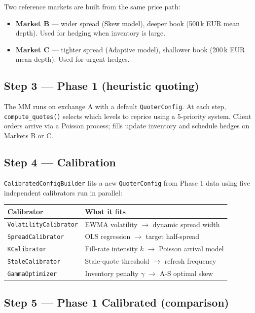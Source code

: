\documentclass[12pt,a4paper]{article}
\begin{document}
Two reference markets are built from the same price path:
\begin{itemize}
  \item \textbf{Market B} --- wider spread (Skew model), deeper book
        (500\,k EUR mean depth). Used for hedging when inventory is large.
  \item \textbf{Market C} --- tighter spread (Adaptive model), shallower book
        (200\,k EUR mean depth). Used for urgent hedges.
\end{itemize}

\subsection*{Step 3 --- Phase 1 (heuristic quoting)}

The MM runs on exchange A with a default \texttt{QuoterConfig}. At each step,
\texttt{compute\_quotes()} selects which levels to reprice using a 5-priority
system. Client orders arrive via a Poisson process; fills update inventory and
schedule hedges on Markets B or C.

\subsection*{Step 4 --- Calibration}

\texttt{CalibratedConfigBuilder} fits a new \texttt{QuoterConfig} from Phase 1
data using five independent calibrators run in parallel:

\begin{center}
\begin{tabular}{ll}
\toprule
\textbf{Calibrator} & \textbf{What it fits} \\
\midrule
\texttt{VolatilityCalibrator} & EWMA volatility $\to$ dynamic spread width \\
\texttt{SpreadCalibrator}     & OLS regression $\to$ target half-spread \\
\texttt{KCalibrator}          & Fill-rate intensity $k$ $\to$ Poisson arrival model \\
\texttt{StaleCalibrator}      & Stale-quote threshold $\to$ refresh frequency \\
\texttt{GammaOptimizer}       & Inventory penalty $\gamma$ $\to$ A-S optimal skew \\
\bottomrule
\end{tabular}
\end{center}

\subsection*{Step 5 --- Phase 1 Calibrated (comparison)}
\end{document}
